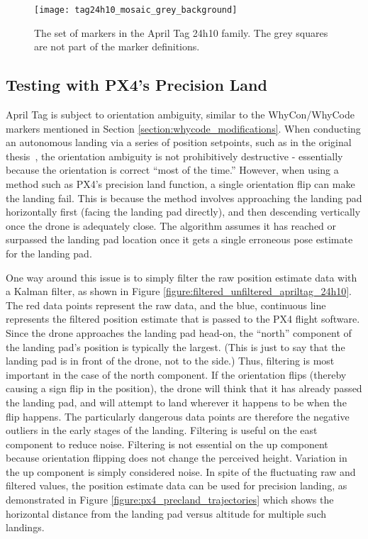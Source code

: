 \begin{figure}
    \centering
    \texttt{[image: tag24h10\_mosaic\_grey\_background]}
    \caption{The set of markers in the April Tag 24h10 family. The grey squares are not part of the marker definitions.}
    \label{figure:apriltag24h10}
\end{figure}

\subsection{Testing with PX4's Precision Land}

April Tag is subject to orientation ambiguity, similar to the WhyCon/WhyCode markers mentioned in Section \ref{section:whycode_modifications}.
When conducting an autonomous landing via a series of position setpoints, such as in the original thesis~\cite{joshua_master_thesis},
the orientation ambiguity is not prohibitively destructive - essentially because the orientation is correct ``most of the time.''
However, when using a method such as PX4's precision land function, a single orientation flip can make the landing fail.
This is because the method involves approaching the landing pad horizontally first (facing the landing pad directly),
and then descending vertically once the drone is adequately close.
The algorithm assumes it has reached or surpassed the landing pad location once it gets a single erroneous pose estimate for the landing pad.

One way around this issue is to simply filter the raw position estimate data with a Kalman filter, as shown in Figure \ref{figure:filtered_unfiltered_apriltag_24h10}.
The red data points represent the raw data, and the blue, continuous line represents the filtered position estimate
that is passed to the PX4 flight software.
Since the drone approaches the landing pad head-on, the ``north'' component of the landing pad's position is typically
the largest.
(This is just to say that the landing pad is in front of the drone, not to the side.)
Thus, filtering is most important in the case of the north component.
If the orientation flips (thereby causing a sign flip in the position),
the drone will think that it has already passed the landing pad, and will attempt to land wherever it happens to be
when the flip happens.
The particularly dangerous data points are therefore the negative outliers in the early stages of the landing.
Filtering is useful on the east component to reduce noise.
Filtering is not essential on the up component because orientation flipping does not change the perceived height.
Variation in the up component is simply considered noise.
In spite of the fluctuating raw and filtered values, the position estimate data can be used for precision landing,
as demonstrated in Figure \ref{figure:px4_precland_trajectories} which shows the horizontal distance from the landing pad versus altitude for multiple such landings.

